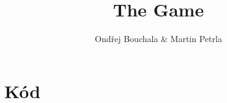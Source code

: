 \documentclass[a4paper]{article}
\begin{document}
\title{The Game}
\author{Ondřej Bouchala & Martin Petrla}
\maketitle
\newpage
\tableofcontents
\newpage
\noindent


\section{Kód}



\end{document}
